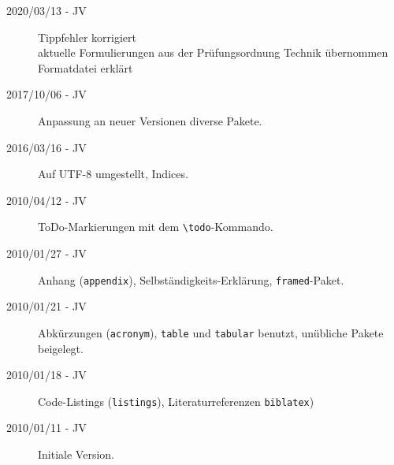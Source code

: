 \begin{description}
	\item[2020/03/13 - JV] Tippfehler korrigiert\\
	                  aktuelle Formulierungen aus der Prüfungsordnung Technik übernommen\\
	                  Formatdatei erklärt
	\item[2017/10/06 - JV] Anpassung an neuer Versionen diverse Pakete.
	\item[2016/03/16 - JV] Auf UTF-8 umgestellt, Indices.
	\item[2010/04/12 - JV] ToDo-Markierungen mit dem \verb+\todo+-Kommando.
	\item[2010/01/27 - JV] Anhang (\texttt{appendix}), Selbständigkeits-Erklärung, \texttt{framed}-Paket.
	\item[2010/01/21 - JV] Abkürzungen (\texttt{acronym}), \texttt{table} und \texttt{tabular} benutzt,
	     unübliche Pakete beigelegt.
	\item[2010/01/18 - JV] Code-Listings (\texttt{listings}), Literaturreferenzen \texttt{biblatex})
	\item[2010/01/11 - JV] Initiale Version.
\end{description}

